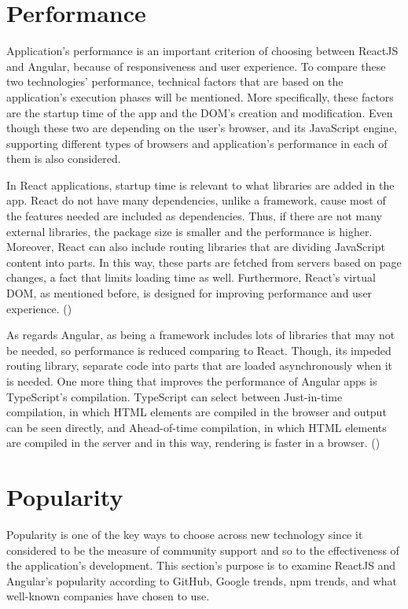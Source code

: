 \section{Performance}

Application's performance is an important criterion of choosing between ReactJS and Angular, because of responsiveness and user experience. To compare these two technologies' performance, technical factors that are based on the application's execution phases will be mentioned. More specifically, these factors are the startup time of the app and the DOM's creation and modification. Even though these two are depending on the user's browser, and its JavaScript engine, supporting different types of browsers and application's performance in each of them is also considered. \par

In React applications, startup time is relevant to what libraries are added in the app. React do not have many dependencies, unlike a framework, cause most of the features needed are included as dependencies. Thus, if there are not many external libraries, the package size is smaller and the performance is higher. Moreover, React can also include routing libraries that are dividing JavaScript content into parts. In this way, these parts are fetched from servers based on page changes, a fact that limits loading time as well. Furthermore, React's virtual DOM, as mentioned before, is designed for improving performance and user experience. (\cite{Reference6}) \par

As regards Angular, as being a framework includes lots of libraries that may not be needed, so performance is reduced comparing to React. Though, its impeded routing library, separate code into parts that are loaded asynchronously when it is needed. One more thing that improves the performance of Angular apps is TypeScript's compilation. TypeScript can select between Just-in-time compilation, in which HTML elements are compiled in the browser and output can be seen directly, and Ahead-of-time compilation, in which HTML elements are compiled in the server and in this way, rendering is faster in a browser. (\cite{Reference6}) \par

\section{Popularity}

Popularity is one of the key ways to choose across new technology since it considered to be the measure of community support and so to the effectiveness of the application's development. This section's purpose is to examine ReactJS and Angular's popularity according to GitHub, Google trends, npm trends, and what well-known companies have chosen to use. \par

